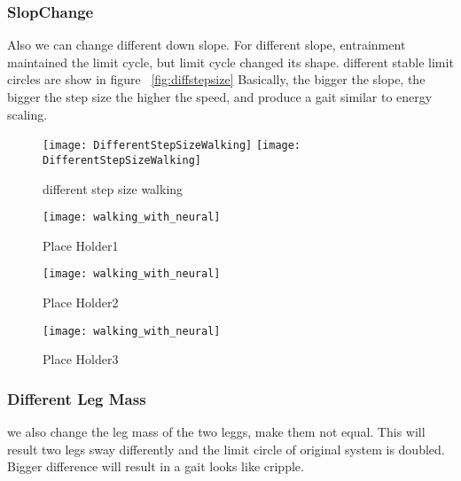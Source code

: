 \subsubsection*{SlopChange}
Also we can change different down slope.
For different slope, entrainment maintained the limit cycle, but limit cycle changed its shape.
different stable limit circles are show in figure ~\ref{fig:diffstepsize}
Basically, the bigger the slope, the bigger the step size the higher the speed, and produce a gait similar to energy scaling.

\begin{figure}[!htbp]
  \begin{center}
    \leavevmode
    \ifpdf
      \texttt{[image: DifferentStepSizeWalking]}
    \else
      \texttt{[image: DifferentStepSizeWalking]}
    \fi
    \caption{different step size walking}
    \label{fig:differentlr}
\end{center}
\end{figure}


\begin{figure}[!htbp]
  \begin{center}
      \texttt{[image: walking\_with\_neural]}
    \caption{Place Holder1}
    \label{fig:ss1}
\end{center}
\end{figure}

\begin{figure}[!htbp]
  \begin{center}
      \texttt{[image: walking\_with\_neural]}
    \caption{Place Holder2}
    \label{fig:ss2}
\end{center}
\end{figure}

\begin{figure}[!htbp]
  \begin{center}
      \texttt{[image: walking\_with\_neural]}
    \caption{Place Holder3}
    \label{fig:ss3}
\end{center}
\end{figure}




\subsubsection*{Different Leg Mass}
we also change the leg mass of the two leggs, make them not equal.
This will result two legs sway differently and the limit circle of original system is doubled.
Bigger difference will result in a gait looks like cripple.

